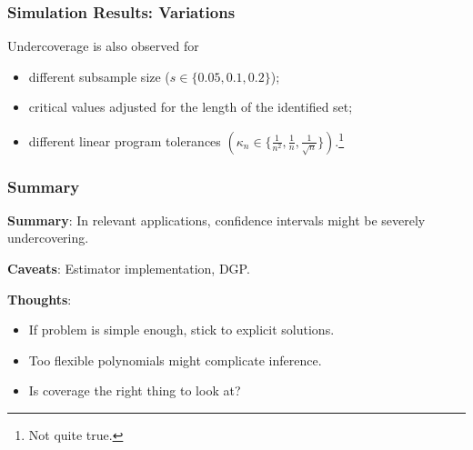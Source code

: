 \documentclass[11pt, aspectratio=169]{beamer}
\begin{document}
\begin{frame}
    \frametitle{Simulation Results: Variations}
    Undercoverage is also observed for
    \begin{itemize}
        \item different subsample size ($s\in\{0.05, 0.1, 0.2\}$);
        \item critical values adjusted for the length of the identified set;
        \item different linear program tolerances $(\kappa_n \in \{\frac{1}{n^2}, \frac{1}{n}, \frac{1}{\sqrt{n}}\})$.\footnote{
            Not quite true.
        }
    \end{itemize}

\end{frame}

\begin{frame}
    \frametitle{Summary}

    \textbf{Summary}: In relevant applications, confidence intervals might be severely undercovering.

    \vspace{0.5cm}

    \textbf{Caveats}: Estimator implementation, DGP\@.

    \vspace{0.5cm}

    \pause

    \textbf{Thoughts}:
    \begin{itemize}
        \item If problem is simple enough, stick to explicit solutions.
        \item Too flexible polynomials might complicate inference.
        \item Is coverage the right thing to look at?
    \end{itemize}

\end{frame}
\end{document}
